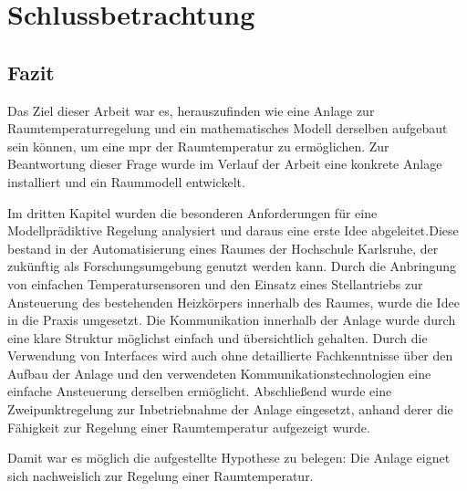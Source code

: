 %
%

\renewcommand{\chapterheadstartvskip}{\vspace*{3cm}}

\chapter{Schlussbetrachtung}
\label{chap:schlussteil}
\renewcommand{\chapterheadstartvskip}{\vspace*{-0.5cm}}

\section{Fazit}
\label{sec:zusammenfassung}

Das Ziel dieser Arbeit war es, herauszufinden wie eine Anlage zur Raumtemperaturregelung und ein mathematisches Modell derselben aufgebaut sein können, um eine \acrlong{mpr} der Raumtemperatur zu ermöglichen.
Zur Beantwortung dieser Frage wurde im Verlauf der Arbeit eine konkrete Anlage installiert und ein Raummodell entwickelt.

Im dritten Kapitel wurden die besonderen Anforderungen für eine Modellprädiktive Regelung analysiert und daraus eine erste Idee abgeleitet.Diese bestand in der Automatisierung eines Raumes der Hochschule Karlsruhe, der zukünftig als Forschungsumgebung genutzt werden kann. Durch die Anbringung von einfachen Temperatursensoren und den Einsatz eines Stellantriebs zur Ansteuerung des bestehenden Heizkörpers innerhalb des Raumes, wurde die Idee in die Praxis umgesetzt. Die Kommunikation innerhalb der Anlage wurde durch eine klare Struktur möglichst einfach und übersichtlich gehalten. Durch die Verwendung von Interfaces wird auch ohne detaillierte Fachkenntnisse über den Aufbau der Anlage und den verwendeten Kommunikationstechnologien eine einfache Ansteuerung derselben ermöglicht. Abschließend wurde eine Zweipunktregelung zur Inbetriebnahme der Anlage eingesetzt, anhand derer die Fähigkeit zur Regelung einer Raumtemperatur aufgezeigt wurde.

Damit war es möglich die aufgestellte Hypothese zu belegen: Die Anlage eignet sich nachweislich zur Regelung einer Raumtemperatur.

